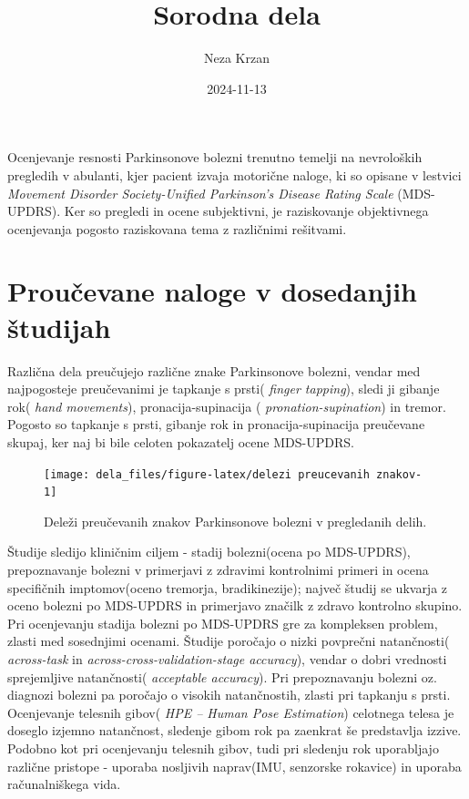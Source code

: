\documentclass[
]{article}
\title{Sorodna dela}
\author{Neza Krzan}
\date{2024-11-13}
\begin{document}
\maketitle

Ocenjevanje resnosti Parkinsonove bolezni trenutno temelji na
nevroloških pregledih v abulanti, kjer pacient izvaja motorične naloge,
ki so opisane v lestvici \emph{Movement Disorder Society-Unified
Parkinson's Disease Rating Scale} (MDS-UPDRS). Ker so pregledi in ocene
subjektivni, je raziskovanje objektivnega ocenjevanja pogosto
raziskovana tema z različnimi rešitvami.

\section{Proučevane naloge v dosedanjih
študijah}\label{prouux10devane-naloge-v-dosedanjih-ux161tudijah}

Različna dela preučujejo različne znake Parkinsonove bolezni, vendar med
najpogosteje preučevanimi je tapkanje s prsti( \emph{finger tapping}),
sledi ji gibanje rok( \emph{hand movements}), pronacija-supinacija (
\emph{pronation-supination}) in tremor. Pogosto so tapkanje s prsti,
gibanje rok in pronacija-supinacija preučevane skupaj, ker naj bi bile
celoten pokazatelj ocene MDS-UPDRS.

\begin{figure}[H]

{\centering \texttt{[image: dela\_files/figure-latex/delezi preucevanih znakov-1]} 

}

\caption{Deleži preučevanih znakov Parkinsonove bolezni v pregledanih delih.}\label{fig:delezi preucevanih znakov}
\end{figure}

Študije sledijo kliničnim ciljem - stadij bolezni(ocena po MDS-UPDRS),
prepoznavanje bolezni v primerjavi z zdravimi kontrolnimi primeri in
ocena specifičnih imptomov(oceno tremorja, bradikinezije); največ študij
se ukvarja z oceno bolezni po MDS-UPDRS in primerjavo značilk z zdravo
kontrolno skupino. Pri ocenjevanju stadija bolezni po MDS-UPDRS gre za
kompleksen problem, zlasti med sosednjimi ocenami. Študije poročajo o
nizki povprečni natančnosti( \emph{across-task} in
\emph{across-cross-validation-stage accuracy}), vendar o dobri vrednosti
sprejemljive natančnosti( \emph{acceptable accuracy}). Pri prepoznavanju
bolezni oz. diagnozi bolezni pa poročajo o visokih natančnostih, zlasti
pri tapkanju s prsti.\\
Ocenjevanje telesnih gibov( \emph{HPE -- Human Pose Estimation})
celotnega telesa je doseglo izjemno natančnost, sledenje gibom rok pa
zaenkrat še predstavlja izzive. Podobno kot pri ocenjevanju telesnih
gibov, tudi pri sledenju rok uporabljajo različne pristope - uporaba
nosljivih naprav(IMU, senzorske rokavice) in uporaba računalniškega
vida.
\end{document}
